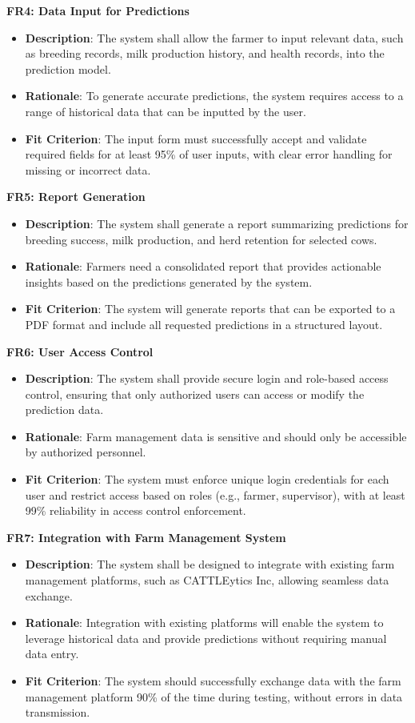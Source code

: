 \documentclass[12pt]{article}
\begin{document}
\textbf{FR4: Data Input for Predictions}
\begin{itemize}
    \item \textbf{Description}: The system shall allow the farmer to input 
    relevant data, such as breeding records, milk production history, and 
    health records, into the prediction model.
    \item \textbf{Rationale}: To generate accurate predictions, the system 
    requires access to a range of historical data that can be inputted by the 
    user.
    \item \textbf{Fit Criterion}: The input form must successfully accept and 
    validate required fields for at least 95\% of user inputs, with clear error 
    handling for missing or incorrect data.
\end{itemize}
\textbf{FR5: Report Generation}
\begin{itemize}
    \item \textbf{Description}: The system shall generate a report summarizing 
    predictions for breeding success, milk production, and herd retention for 
    selected cows.
    \item \textbf{Rationale}: Farmers need a consolidated report that provides 
    actionable insights based on the predictions generated by the system.
    \item \textbf{Fit Criterion}: The system will generate reports that can be 
    exported to a PDF format and include all requested predictions in a 
    structured layout.
\end{itemize}
\textbf{FR6: User Access Control}
\begin{itemize}
    \item \textbf{Description}: The system shall provide secure login and 
    role-based access control, ensuring that only authorized users can access 
    or modify the prediction data.
    \item \textbf{Rationale}: Farm management data is sensitive and should only 
    be accessible by authorized personnel.
    \item \textbf{Fit Criterion}: The system must enforce unique login 
    credentials for each user and restrict access based on roles (e.g., farmer, 
    supervisor), with at least 99\% reliability in access control enforcement.
\end{itemize}
\textbf{FR7: Integration with Farm Management System}
\begin{itemize}
    \item \textbf{Description}: The system shall be designed to integrate with 
    existing farm management platforms, such as CATTLEytics Inc, allowing 
    seamless data exchange.
    \item \textbf{Rationale}: Integration with existing platforms will enable 
    the system to leverage historical data and provide predictions without 
    requiring manual data entry.
    \item \textbf{Fit Criterion}: The system should successfully exchange data 
    with the farm management platform 90\% of the time during testing, 
    without errors in data transmission.
\end{itemize}
\end{document}
